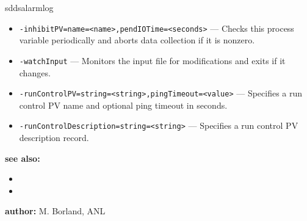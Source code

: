 \begin{sddsprog}{sddsalarmlog}
\begin{itemize}
  \item {\tt -inhibitPV=name=<name>,pendIOTime=<seconds>} --- Checks this process variable periodically and aborts data collection if it is nonzero.
  \item {\tt -watchInput} --- Monitors the input file for modifications and exits if it changes.
  \item {\tt -runControlPV=string=<string>,pingTimeout=<value>} --- Specifies a run control PV name and optional ping timeout in seconds.
  \item {\tt -runControlDescription=string=<string>} --- Specifies a run control PV description record.
\end{itemize}

\item \textbf{see also:}
\begin{itemize}
  \item {}
  \item {}
\end{itemize}


\item \textbf{author:} M. Borland, ANL
\end{sddsprog}
